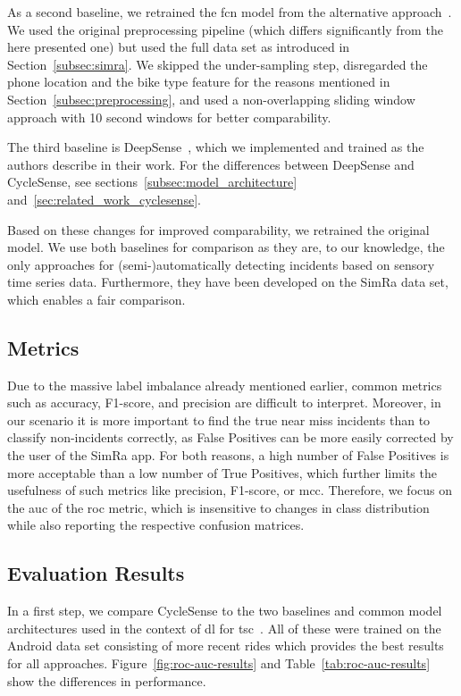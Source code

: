 As a second baseline, we retrained the \ac{fcn} model from the alternative approach~\cite{sanchez2020detecting}.
We used the original preprocessing pipeline (which differs significantly from the here presented one) but used the full data set as introduced in Section~\ref{subsec:simra}.
We skipped the under-sampling step, disregarded the phone location and the bike type feature for the reasons mentioned in Section~\ref{subsec:preprocessing}, and used a non-overlapping sliding window approach with 10 second windows for better comparability.

The third baseline is DeepSense~\cite{yao2017deepsense}, which we implemented and trained as the authors describe in their work.
For the differences between DeepSense and CycleSense, see sections~\ref{subsec:model_architecture} and~\ref{sec:related_work_cyclesense}.

Based on these changes for improved comparability, we retrained the original model.
We use both baselines for comparison as they are, to our knowledge, the only approaches for (semi-)automatically detecting incidents based on sensory time series data.
Furthermore, they have been developed on the SimRa data set, which enables a fair comparison.

\subsection{Metrics}
\label{subsec:metrics}
Due to the massive label imbalance already mentioned earlier, common metrics such as accuracy, F1-score, and precision are difficult to interpret.
Moreover, in our scenario it is more important to find the true near miss incidents than to classify non-incidents correctly, as False Positives can be more easily corrected by the user of the SimRa app.
For both reasons, a high number of False Positives is more acceptable than a low number of True Positives, which further limits the usefulness of such metrics like precision, F1-score, or \ac{mcc}.
Therefore, we focus on the \ac{auc} of the \ac{roc} metric, which is insensitive to changes in class distribution~\cite{fawcett2006introduction} while also reporting the respective confusion matrices.

\subsection{Evaluation Results}
\label{subsec:evaluation_results}
In a first step, we compare CycleSense to the two baselines and common model architectures used in the context of \ac{dl} for \ac{tsc}~\cite{ismail2019deep}.
All of these were trained on the Android data set consisting of more recent rides which provides the best results for all approaches.
Figure~\ref{fig:roc-auc-results} and Table~\ref{tab:roc-auc-results} show the differences in performance.

